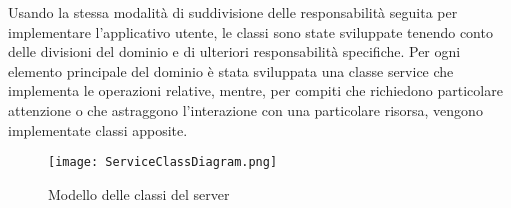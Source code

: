 Usando la stessa modalità di suddivisione delle responsabilità
seguita per implementare l'applicativo utente,
le classi sono state sviluppate tenendo conto delle divisioni del dominio
e di ulteriori responsabilità specifiche.
Per ogni elemento principale del dominio è stata sviluppata
una classe service che implementa le operazioni relative,
mentre, per compiti che richiedono particolare attenzione o 
che astraggono l'interazione con una particolare risorsa,
vengono implementate classi apposite.\\
\clearpage
\begin{figure}[h!]
    \begin{center}
        \texttt{[image: ServiceClassDiagram.png]}
        \caption{Modello delle classi del server}
    \end{center}
\end{figure}

